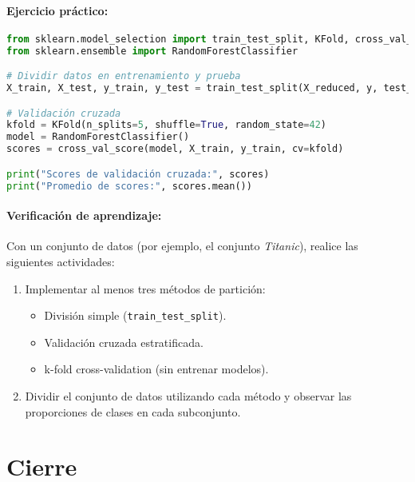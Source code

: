 \documentclass[a4,11pt]{aleph-notas}
\begin{document}
\paragraph{Ejercicio práctico:}  \hspace{0pt}

\begin{pycodigo}
\begin{lstlisting}[language=Python]
from sklearn.model_selection import train_test_split, KFold, cross_val_score
from sklearn.ensemble import RandomForestClassifier

# Dividir datos en entrenamiento y prueba
X_train, X_test, y_train, y_test = train_test_split(X_reduced, y, test_size=0.2, random_state=42)

# Validación cruzada
kfold = KFold(n_splits=5, shuffle=True, random_state=42)
model = RandomForestClassifier()
scores = cross_val_score(model, X_train, y_train, cv=kfold)

print("Scores de validación cruzada:", scores)
print("Promedio de scores:", scores.mean())
\end{lstlisting}
\end{pycodigo}


\paragraph{Verificación de aprendizaje:} Con un conjunto de datos  (por ejemplo, el conjunto \textit{Titanic}), realice las siguientes actividades:
\begin{enumerate}
    \item Implementar al menos tres métodos de partición:
    \begin{itemize}
        \item División simple (\texttt{train\_test\_split}).
        \item Validación cruzada estratificada.
        \item k-fold cross-validation (sin entrenar modelos).
    \end{itemize}
    \item Dividir el conjunto de datos utilizando cada método y observar las proporciones de clases en cada subconjunto.
\end{enumerate}



\section*{Cierre}
\end{document}
